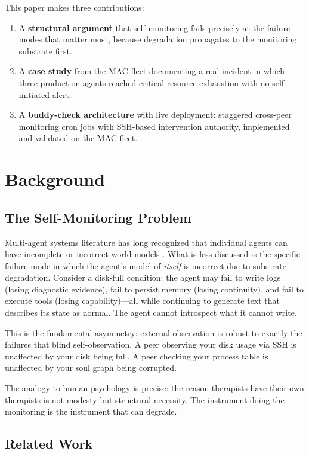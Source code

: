 \documentclass[11pt]{article}
\begin{document}
This paper makes three contributions:
\begin{enumerate}
  \item A \textbf{structural argument} that self-monitoring fails precisely at the failure modes that matter most, because degradation propagates to the monitoring substrate first.
  \item A \textbf{case study} from the MAC fleet documenting a real incident in which three production agents reached critical resource exhaustion with no self-initiated alert.
  \item A \textbf{buddy-check architecture} with live deployment: staggered cross-peer monitoring cron jobs with SSH-based intervention authority, implemented and validated on the MAC fleet.
\end{enumerate}

\section{Background}

\subsection{The Self-Monitoring Problem}

Multi-agent systems literature has long recognized that individual agents can have incomplete or incorrect world models \cite{mabs2022}. What is less discussed is the specific failure mode in which the agent's model of \emph{itself} is incorrect due to substrate degradation. Consider a disk-full condition: the agent may fail to write logs (losing diagnostic evidence), fail to persist memory (losing continuity), and fail to execute tools (losing capability)---all while continuing to generate text that describes its state as normal. The agent cannot introspect what it cannot write.

This is the fundamental asymmetry: external observation is robust to exactly the failures that blind self-observation. A peer observing your disk usage via SSH is unaffected by your disk being full. A peer checking your process table is unaffected by your soul graph being corrupted.

The analogy to human psychology is precise: the reason therapists have their own therapists is not modesty but structural necessity. The instrument doing the monitoring is the instrument that can degrade.

\subsection{Related Work}
\end{document}
